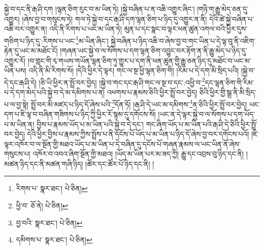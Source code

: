 སྐྱེ་བ་དང་ནི་རྒ་ཤི་དག །ལྷན་ཅིག་རུང་བ་མ་ཡིན་ཏེ། །སྐྱེ་བཞིན་པ་ན་འཆི་འགྱུར་ཞིང་། །གཉི་ག་རྒྱུ་མེད་ཅན་དུ་འགྱུར། །ཞེས་བྱ་བ་གསུངས་ཏེ། གལ་ཏེ་སྐྱེ་བ་དང་རྒ་ཤི་དག་ལྷན་ཅིག་པ་ཉིད་དུ་འགྱུར་ན་ནི། དེའི་ཚེ་སྐྱེ་བཞིན་པ་འཆི་བར་འགྱུར་ན། འདི་ནི་རིགས་པ་ཡང་མ་ཡིན་ཏེ། མུན་པ་དང་སྣང་བ་ལྟར་ཕན་ཚུན་འགལ་བའི་ཕྱིར་དུས་གཅིག་པ་ཉིད་དུ་:རིགས་པ་ཡང་\footnote{རིགས་པ་  སྣར་ཐང་།  པེ་ཅིན། }མ་ཡིན་ཞིང་། སྐྱེ་བཞིན་པ་ཉིད་འཆི་བ་ཞེས་བྱ་བ་གང་ཡིན་པ་དེ་ལྟ་བུ་ནི་འཇིག་རྟེན་དུ་ཡང་མ་མཐོང་ངོ། །གཞན་ཡང་སྐྱེ་བ་ལ་སོགས་པ་དག་ལྷན་ཅིག་འབྱུང་བར་རྟོག་ན་ནི་རྒྱུ་མེད་པ་ཉིད་དུ་འགྱུར་རོ། །བ་གླང་གི་རྭ་གཡས་གཡོན་ལྷན་ཅིག་ཏུ་གྱུར་པ་དག་ནི་ཕན་ཚུན་གྱི་རྒྱུ་ཅན་ཉིད་དུ་མཐོང་བ་ཡང་མ་ཡིན་པས། འདི་ནི་མི་རིགས་སོ། །དེའི་ཕྱིར་དེ་ལྟར། གང་ལ་སྔ་ཕྱི་ལྷན་ཅིག་གི། །རིམ་པ་དེ་དག་མི་སྲིད་པའི། །སྐྱེ་བ་དེ་དང་རྒ་ཤི་དེ། །ཅི་ཡི་ཕྱིར་ན་སྤྲོ་བར་བྱེད། །སྐྱེ་བ་གང་དང་རྒ་ཤི་གང་ལ་སྔ་བ་དང་:འཕྱི་བ་\footnote{ཕྱི་བ་  ཅོ་ནེ།  པེ་ཅིན། }དང་ལྷན་ཅིག་གི་རིམ་པ་དེ་དག་མེད་པའི་སྐྱེ་བ་དེ་མ་དམིགས་པ་ན། འཕགས་པ་རྣམས་ཅིའི་ཕྱིར་སྤྲོ་བར་བྱེད། ཅིའི་ཕྱིར་གྱི་སྒྲ་ནི་མི་སྲིད་པ་ལ་བྱ་སྟེ། སྤྲོ་བར་མི་མཛད་པ་ཉིད་དོ་ཞེས་པའི་\footnote{བྱ་བའི་  སྣར་ཐང་།  པེ་ཅིན། }དོན་ཏོ། །རྒ་ཤི་དེ་ཡང་མ་དམིགས་\footnote{དམིགས་པ་  སྣར་ཐང་།  པེ་ཅིན། }ན་ཅིའི་ཕྱིར་སྤྲོ་བར་བྱེད། ཡང་དག་པ་ཇི་ལྟ་བ་བཞིན་གཟིགས་པ་ཉིད་ཀྱི་ཕྱིར་རོ་སྙམ་དུ་དགོངས་སོ། །ཡང་ན་དེ་ལྟར་སྐྱེ་བ་ལ་སོགས་པ་དག་ཡོད་པ་མ་ཡིན་ན། བྱིས་པ་རྣམས་ཡོད་པ་མ་ཡིན་པའི་སྐྱེ་བ་དེ་དང་། གང་ཞིག་ཡོད་པ་མ་ཡིན་པའི་རྒ་ཤི་དེ་ཅིའི་ཕྱིར་སྤྲོ་བར་བྱེད། དེའི་ཕྱིར་བྱིས་པ་རྣམས་ཀྱིས་སྤྲོས་པ་ནི་དངོས་པོ་ཡོད་པ་མ་ཡིན་པ་ཉིད་དོ་ཞེས་བྱ་བར་དགོངས་པའོ། །ཇི་ལྟར་འཁོར་བ་ལ་སྔོན་གྱི་མཐའ་ཡོད་པ་མ་ཡིན་པ་དེ་བཞིན་དུ་དངོས་པོ་གཞན་རྣམས་ལ་ཡང་ཡིན་ནོ་ཞེས་གསུངས་པ། འཁོར་བ་འབའ་ཞིག་སྔོན་གྱི་མཐའ། །ཡོད་མ་ཡིན་པར་མ་ཟད་ཀྱི། རྒྱུ་དང་འབྲས་བུ་ཉིད་དང་ནི། །མཚན་ཉིད་དང་ནི་མཚན་གཞི་ཉིད། །ཚོར་དང་ཚོར་པོ་ཉིད་དང་ནི། །
